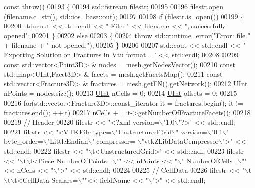 \begin{DoxyCode}
{      const} \textcolor{keywordflow}{throw}()
00193 \{
00194     std::fstream filestr;
00195 
00196     filestr.open (filename.c\_str(), std::ios\_base::out);
00197 
00198     \textcolor{keywordflow}{if} (filestr.is\_open())
00199     \{
00200         std::cout << std::endl << \textcolor{stringliteral}{" File: "} << filename << \textcolor{stringliteral}{", successfully opened"};
00201     \}
00202     \textcolor{keywordflow}{else}
00203     \{
00204         \textcolor{keywordflow}{throw} std::runtime\_error(\textcolor{stringliteral}{"Error: file "} + filename + \textcolor{stringliteral}{" not opened."});
00205     \}
00206 
00207     std::cout << std::endl << \textcolor{stringliteral}{" Exporting Solution on Fractures in Vtu format... "} << std::endl;
00208 
00209     \textcolor{keyword}{const} std::vector<Point3D> & nodes = mesh.getNodesVector();
00210     \textcolor{keyword}{const} std::map<UInt,Facet3D> & facets = mesh.getFacetsMap();
00211     \textcolor{keyword}{const} std::vector<Fracture3D> & fractures = mesh.getFN().getNetwork();
00212     \hyperlink{namespaceFVCode3D_a4bf7e328c75d0fd504050d040ebe9eda}{UInt} nPoints = nodes.size();
00213     \hyperlink{namespaceFVCode3D_a4bf7e328c75d0fd504050d040ebe9eda}{UInt} nCells = 0;
00214     \hyperlink{namespaceFVCode3D_a4bf7e328c75d0fd504050d040ebe9eda}{UInt} offsets = 0;
00215 
00216     \textcolor{keywordflow}{for}(std::vector<Fracture3D>::const\_iterator it = fractures.begin(); it != fractures.end(); ++it)
00217         nCells += it->getNumberOfFractureFacets();
00218 
00219     \textcolor{comment}{// Header}
00220     filestr << \textcolor{stringliteral}{"<?xml version=\(\backslash\)"1.0\(\backslash\)"?>"} << std::endl;
00221     filestr << \textcolor{stringliteral}{"<VTKFile type=\(\backslash\)"UnstructuredGrid\(\backslash\)" version=\(\backslash\)"0.1\(\backslash\)" byte\_order=\(\backslash\)"LittleEndian\(\backslash\)" compressor=
      \(\backslash\)"vtkZLibDataCompressor\(\backslash\)">"} << std::endl;
00222     filestr << \textcolor{stringliteral}{"\(\backslash\)t<UnstructuredGrid>"} << std::endl;
00223     filestr << \textcolor{stringliteral}{"\(\backslash\)t\(\backslash\)t<Piece NumberOfPoints=\(\backslash\)""} << nPoints << \textcolor{stringliteral}{"\(\backslash\)" NumberOfCells=\(\backslash\)""} << nCells << \textcolor{stringliteral}{"\(\backslash\)">"} << 
      std::endl;
00224 
00225     \textcolor{comment}{// CellData}
00226     filestr << \textcolor{stringliteral}{"\(\backslash\)t\(\backslash\)t\(\backslash\)t<CellData Scalars=\(\backslash\)""}<< fieldName << \textcolor{stringliteral}{"\(\backslash\)">"} << std::endl;

\end{DoxyCode}
